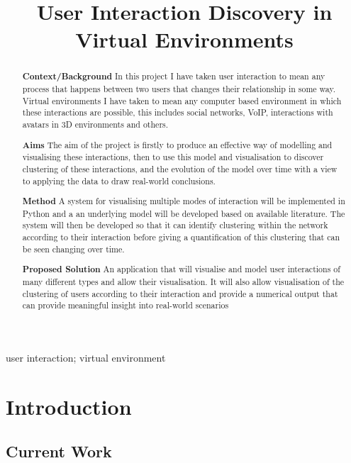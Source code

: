\documentclass[12pt,a4paper]{article}
\title{User Interaction Discovery in Virtual Environments}
\date{}
\begin{document}
\maketitle

\begin{abstract}

{\bf Context/Background}
In this project I have taken user interaction to mean any process that happens between two users that changes their relationship in some way. Virtual environments I have taken to mean any computer based environment in which these interactions are possible, this includes social networks, VoIP, interactions with avatars in 3D environments and others.

{\bf Aims}
The aim of the project is firstly to produce an effective way of modelling and visualising these interactions, then to use this model and visualisation to discover clustering of these interactions, and the evolution of the model over time with a view to applying the data to draw real-world conclusions.

{\bf Method}
A system for visualising multiple modes of interaction will be implemented in Python and a an underlying model will be developed based on available literature. The system will then be developed so that it can identify clustering within the network according to their interaction before giving a quantification of this clustering that can be seen changing over time.

{\bf Proposed Solution}
An application that will visualise and model user interactions of many different types and allow their visualisation. It will also allow visualisation of the clustering of users according to their interaction and provide a numerical output that can provide meaningful insight into real-world scenarios

\end{abstract}

\begin{keywords}
user interaction; virtual environment
\end{keywords}

\section{Introduction}

\subsection{Current Work}
\end{document}
